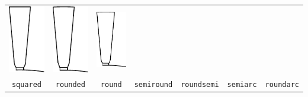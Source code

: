 \documentclass[a4paper,11pt,oneside]{report}
\begin{document}
{\begin{tabular}{ccccccc}
\includegraphics{../examples/slots/roundsemi_slot} &
\includegraphics{../examples/slots/semiarc_slot} &
\includegraphics{../examples/slots/roundarc_slot} \\
%
\texttt{squared} &
\texttt{rounded} &
\texttt{round} &
\texttt{semiround} &
\texttt{roundsemi} &
\texttt{semiarc} & 
\texttt{roundarc}
\end{tabular}}
\vspace{1cm}


\newpage
\end{document}
